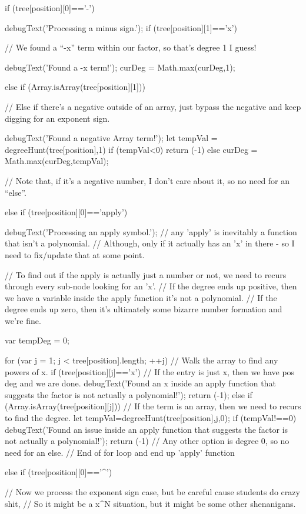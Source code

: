 \documentclass{ximera}
\begin{document}
\begin{javascript}
{    if (tree[position][0]=='-') {
        debugText('Processing a minus sign.');
        if (tree[position][1]=='x') {
            // We found a ``-x'' term within our factor, so that's degree 1 I guess!
            
            debugText('Found a -x term!');
            curDeg = Math.max(curDeg,1);
            
        } else if (Array.isArray(tree[position][1])) {
            // Else if there's a negative outside of an array, just bypass the negative and keep digging for an exponent sign.
            
            debugText('Found a negative Array term!');
            let tempVal = degreeHunt(tree[position],1)
            if (tempVal<0) { return (-1)} else {
                curDeg = Math.max(curDeg,tempVal);
            }
            
            
        }// Note that, if it's a negative number, I don't care about it, so no need for an ``else''.
    } else if (tree[position][0]=='apply') {
        debugText('Processing an apply symbol.');
        // any 'apply' is inevitably a function that isn't a polynomial.
        //  Although, only if it actually has an 'x' in there - so I need to fix/update that at some point.
        
        // To find out if the apply is actually just a number or not, we need to recurs through every sub-node looking for an 'x'.
        //  If the degree ends up positive, then we have a variable inside the apply function it's not a polynomial.
        //  If the degree ends up zero, then it's ultimately some bizarre number formation and we're fine.
        
        var tempDeg = 0;
        
        for (var j = 1; j < tree[position].length; ++j) {
            // Walk the array to find any powers of x.
            if (tree[position][j]=='x') {
                // If the entry is just x, then we have pos deg and we are done.
                debugText('Found an x inside an apply function that suggests the factor is not actually a polynomial!');
                return (-1);
            } else if (Array.isArray(tree[position][j])) {
                // If the term is an array, then we need to recurs to find the degree.
                let tempVal=degreeHunt(tree[position],j,0);
                if (tempVal!==0) {
                    debugText('Found an issue inside an apply function that suggests the factor is not actually a polynomial!');
                    return (-1)
                }
            }// Any other option is degree 0, so no need for an else.
        }// End of for loop and end up 'apply' function
    } else if (tree[position][0]=='^') {
        // Now we process the exponent sign case, but be careful cause students do crazy shit,
        //  So it might be a x^N situation, but it might be some other shenanigans.
        
}}
\end{javascript}
\end{document}
